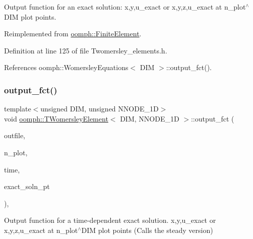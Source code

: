 Output function for an exact solution\+: x,y,u\+\_\+exact or x,y,z,u\+\_\+exact at n\+\_\+plot$^\wedge$\+D\+IM plot points. 



Reimplemented from \hyperlink{classoomph_1_1FiniteElement_a22b695c714f60ee6cd145be348042035}{oomph\+::\+Finite\+Element}.



Definition at line 125 of file Twomersley\+\_\+elements.\+h.



References oomph\+::\+Womersley\+Equations$<$ D\+I\+M $>$\+::output\+\_\+fct().

\mbox{\label{classoomph_1_1TWomersleyElement_a2ff66a70ff364d1ddfc0ef0a99ad70cb}} 
\subsubsection{\texorpdfstring{output\+\_\+fct()}{output\_fct()}\hspace{0.1cm}{\footnotesize\ttfamily [2/2]}}
{\footnotesize\ttfamily template$<$unsigned D\+IM, unsigned N\+N\+O\+D\+E\+\_\+1D$>$ \\
void \hyperlink{classoomph_1_1TWomersleyElement}{oomph\+::\+T\+Womersley\+Element}$<$ D\+IM, N\+N\+O\+D\+E\+\_\+1D $>$\+::output\+\_\+fct (\begin{DoxyParamCaption}\item[{std\+::ostream \&}]{outfile,  }\item[{const unsigned \&}]{n\+\_\+plot,  }\item[{const double \&}]{time,  }\item[{\hyperlink{classoomph_1_1FiniteElement_ad4ecf2b61b158a4b4d351a60d23c633e}{Finite\+Element\+::\+Unsteady\+Exact\+Solution\+Fct\+Pt}}]{exact\+\_\+soln\+\_\+pt }\end{DoxyParamCaption})\hspace{0.3cm}{\ttfamily [inline]}, {\ttfamily [virtual]}}



Output function for a time-\/dependent exact solution. x,y,u\+\_\+exact or x,y,z,u\+\_\+exact at n\+\_\+plot$^\wedge$\+D\+IM plot points (Calls the steady version) 



